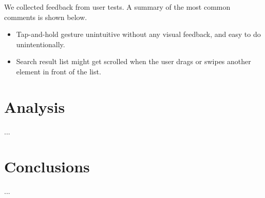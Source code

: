 \documentclass[conference]{IEEEtran}
\begin{document}
We collected feedback from user tests.
A summary of the most common comments is shown below.

\begin{itemize}
    \item Tap-and-hold gesture unintuitive without any visual feedback, and easy to do unintentionally.
    \item Search result list might get scrolled when the user drags or swipes another element in front of the list.
\end{itemize}

\section{Analysis}
...

\section{Conclusions}
...






%


\end{document}
